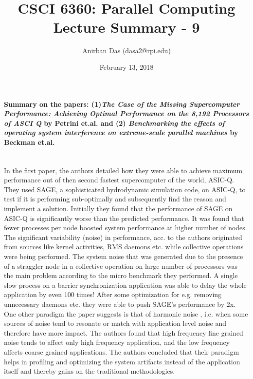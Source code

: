 \documentclass[a4paper,12 pt]{article}
\title{\vspace{-2.0cm}CSCI 6360: Parallel Computing Lecture Summary - 9}
\author{Anirban Das (dasa2@rpi.edu) }
\date{February 13, 2018}
\begin{document}
\maketitle

\paragraph{Summary on the papers: (1)\textit{The Case of the Missing Supercomputer Performance:
Achieving Optimal Performance on the 8,192 Processors of ASCI Q} by Petrini et.al. and (2) \textit{Benchmarking the effects of operating system interference
on extreme-scale parallel machines} by Beckman et.al.\\\\}

In the first paper, the authors detailed how they were able to achieve maximum performance out of then second fastest supercomputer of the world, ASIC-Q. They used SAGE, a sophisticated hydrodynamic simulation code, on ASIC-Q, to test if it is performing sub-optimally and subsequently find the reason and 	implement a solution. Initially they found that the performance of SAGE on ASIC-Q is significantly worse than the predicted performance. It was found that fewer processes per node boosted system performance at higher number of nodes. The significant variability (noise) in performance, acc. to the authors originated from sources like kernel activities, RMS daemons etc. while collective operations were being performed. The system noise that was generated due to the presence of a straggler node in a collective operation on large number of processors was the main problem according to the micro benchmark they performed. A single slow process on a barrier synchronization application was able to delay the whole application by even 100 times! After some optimization for e.g. removing unnecessary daemons etc. they were able to push SAGE's performance by 2x. One other paradigm the paper suggests is that of  harmonic noise , i.e. when some sources of noise tend to resonate or match with application level noise and therefore have more impact. The authors found that high frequency fine grained noise tends to affect only high frequency application, and the low frequency affects coarse grained applications. The authors concluded that their paradigm helps in profiling and optimizing the system artifacts instead of the application itself and thereby gains on the traditional methodologies.
\end{document}
